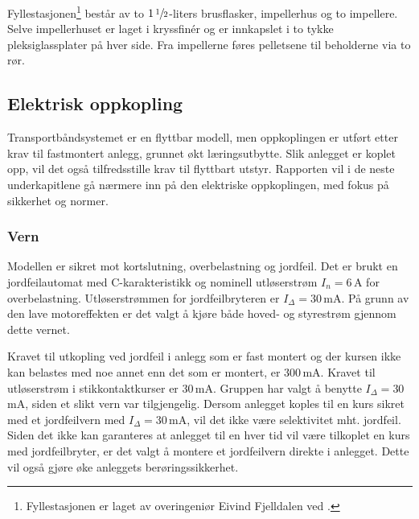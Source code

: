 \documentclass[Visionprosjekt.tex]{subfiles}
\begin{document}

Fyllestasjonen\footnote{Fyllestasjonen er laget av overingeniør Eivind Fjelldalen ved \HiT.} består av to $1\,\sfrac{1}{2}$-liters brusflasker, impellerhus og to impellere. Selve impellerhuset er laget i kryssfinér og er innkapslet i to tykke pleksiglassplater på hver side. Fra impellerne føres pelletsene til  beholderne via to rør.




\subsection{Elektrisk oppkopling}

Transportbåndsystemet er en flyttbar modell, men oppkoplingen er utført etter krav til fastmontert anlegg, grunnet økt læringsutbytte. Slik anlegget er koplet opp, vil det også tilfredsstille krav til flyttbart utstyr. Rapporten vil i de neste underkapitlene gå nærmere inn på den elektriske oppkoplingen, med fokus på sikkerhet og normer.





\subsubsection{Vern}\label{subsub:vern}

Modellen  er sikret  mot kortslutning, overbelastning og jordfeil. Det er brukt en jordfeilautomat med C-karakteristikk og nominell utløserstrøm $I_n= 6$\,A for overbelastning.  Utløserstrømmen for jordfeilbryteren er $I_\Delta=30$\,mA. På grunn av den lave motoreffekten er det valgt å kjøre både hoved- og styrestrøm gjennom dette vernet.

Kravet til utkopling ved jordfeil i anlegg som er fast montert og der kursen ikke kan belastes med noe annet enn det som er montert, er 300\,mA.  Kravet til utløserstrøm i stikkontaktkurser er 30\,mA. Gruppen har valgt å benytte $I_\Delta=30$\,mA, siden et slikt vern var tilgjengelig. Dersom anlegget koples til en kurs sikret med et jordfeilvern med $I_\Delta=30$\,mA, vil det ikke være selektivitet mht. jordfeil. Siden det ikke  kan garanteres at anlegget til en hver tid vil være tilkoplet en kurs med jordfeilbryter, er det valgt å montere et jordfeilvern direkte i anlegget. Dette vil også gjøre øke anleggets berøringssikkerhet.
\end{document}
